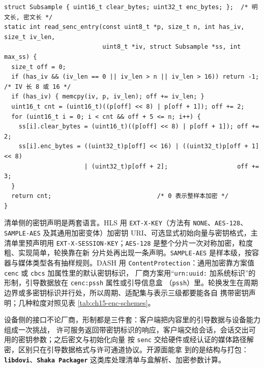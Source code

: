\documentclass[12pt,a4paper,fontset=fandol]{ctexbook}
\newcommand{\Tp}[1]{\texttt{#1}}
\newcommand{\Lib}[1]{\textbf{\texttt{#1}}}
\begin{document}
\begin{lstlisting}[style=cstyle,caption={\Tp{senc} 内逐样本初始化向量与子样本表的读取骨架（只解析，不解密）},label={lst:ch15-senc}]
struct Subsample { uint16_t clear_bytes; uint32_t enc_bytes; };  /* 明文长, 密文长 */
static int read_senc_entry(const uint8_t *p, size_t n, int has_iv, size_t iv_len,
                           uint8_t *iv, struct Subsample *ss, int max_ss) {
  size_t off = 0;
  if (has_iv && (iv_len == 0 || iv_len > n || iv_len > 16)) return -1; /* IV 长 8 或 16 */
  if (has_iv) { memcpy(iv, p, iv_len); off += iv_len; }
  uint16_t cnt = (uint16_t)((p[off] << 8) | p[off + 1]); off += 2;
  for (uint16_t i = 0; i < cnt && off + 5 <= n; i++) {
    ss[i].clear_bytes = (uint16_t)((p[off] << 8) | p[off + 1]); off += 2;
    ss[i].enc_bytes = ((uint32_t)p[off] << 16) | ((uint32_t)p[off + 1] << 8)
                      | (uint32_t)p[off + 2];                   off += 3;
  }
  return cnt;                             /* 0 表示整样本加密 */
}
\end{lstlisting}

清单侧的密钥声明是两套语言。HLS 用 \Tp{EXT-X-KEY}（方法有 \Tp{NONE}、\Tp{AES-128}、
\Tp{SAMPLE-AES} 及其通用加密变体）加密钥 URI、可选显式初始向量与密钥格式，主清单里预声明用
\Tp{EXT-X-SESSION-KEY}；\Tp{AES-128} 是整个分片一次对称加密，粒度粗、实现简单，轮换靠在新
分片处再出现一条声明。\Tp{SAMPLE-AES} 是样本级，按容器与媒体类型各有抽样规则。DASH 用
\Tp{ContentProtection}：通用加密靠方案值 \Tp{cenc} 或 \Tp{cbcs} 加属性里的默认密钥标识，
厂商方案用``\Tp{urn:uuid:} 加系统标识''的形制，引导数据放在 \Tp{cenc:pssh} 属性或引导信息盒
（\Tp{pssh}）里。轮换发生在周期边界或多密钥标识并行处，所以周期、适配集与表示三级都要能各自
携带密钥声明；几种粒度对照见表 \ref{tab:ch15-enc-schemes}。

设备侧的接口不论厂商，形制都是三件套：客户端把内容里的引导数据与设备能力组成一次挑战，
许可服务返回带密钥标识的响应，客户端交给会话，会话交出可用的密钥参数；之后密文与初始化向量
按 \Tp{senc} 交给硬件或经认证的媒体路径解密，区别只在引导数据格式与许可通道协议。开源面能拿
到的是结构与打包：\Lib{libdovi}、\Lib{Shaka Packager} 这类库处理清单与盒解析、加密参数计算。
\end{document}
